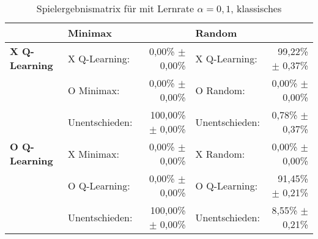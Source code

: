 \begin{table}
\centering
\caption[Spielergebnismatrix \qlearning: $\alpha=0,1$, klassisches \splay]{Spielergebnismatrix für \qlearning mit Lernrate $\alpha=0,1$, klassisches \splay}
\label{tab:resultmatrix_ql_normal_alpha01}

\begin{tabular}{llrlr}
\toprule
 & \multicolumn{2}{l}{\textbf{Minimax}} & \multicolumn{2}{l}{\textbf{Random}} \\ \midrule
\textbf{X Q-Learning}   & X Q-Learning:     & 0,00\% $\pm$    0,00\%            & X Q-Learning:         & 99,22\% $\pm$ 0,37\%  \\
                        & O Minimax:        & 0,00\% $\pm$    0,00\%            & O Random:            & 0,00\% $\pm$ 0,00\%  \\
                        & Unentschieden:    & 100,00\% $\pm$  0,00\%            & Unentschieden:        & 0,78\% $\pm$ 0,37\%  \\ \cmidrule{2-5}
\textbf{O Q-Learning}   & X Minimax:        & 0,00\% $\pm$    0,00\%            & X Random:             & 0,00\% $\pm$ 0,00\%  \\
                        & O Q-Learning:     & 0,00\% $\pm$    0,00\%            & O Q-Learning:         & 91,45\% $\pm$ 0,21\%  \\
                        & Unentschieden:    & 100,00\% $\pm$  0,00\%            & Unentschieden:        & 8,55\% $\pm$ 0,21\%  \\ \bottomrule
\end{tabular}
\end{table}